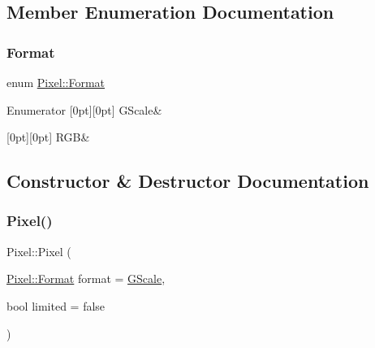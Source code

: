 \subsection{Member Enumeration Documentation}
\mbox{\label{class_pixel_aa1531d5d16ab3ab809a8e071145f0a50}} 
\subsubsection{\texorpdfstring{Format}{Format}}
{\footnotesize\ttfamily enum \mbox{\hyperlink{class_pixel_aa1531d5d16ab3ab809a8e071145f0a50}{Pixel\+::\+Format}}}

\begin{DoxyEnumFields}{Enumerator}
[0pt][0pt]{}\mbox{\label{class_pixel_aa1531d5d16ab3ab809a8e071145f0a50a0067e32761943fc277951f656686ce1a}} 
G\+Scale&\\
\hline

[0pt][0pt]{}\mbox{\label{class_pixel_aa1531d5d16ab3ab809a8e071145f0a50aff2c7eeaaaaf24a83e97388116481444}} 
R\+GB&\\
\hline

\end{DoxyEnumFields}


\subsection{Constructor \& Destructor Documentation}
\mbox{\label{class_pixel_ac82279ce9ebca9dde69f1b0c50adab42}} 
\subsubsection{\texorpdfstring{Pixel()}{Pixel()}\hspace{0.1cm}{\footnotesize\ttfamily [1/3]}}
{\footnotesize\ttfamily Pixel\+::\+Pixel (\begin{DoxyParamCaption}\item[{\mbox{\hyperlink{class_pixel_aa1531d5d16ab3ab809a8e071145f0a50}{Pixel\+::\+Format}}}]{format = {\ttfamily \mbox{\hyperlink{class_pixel_aa1531d5d16ab3ab809a8e071145f0a50a0067e32761943fc277951f656686ce1a}{G\+Scale}}},  }\item[{bool}]{limited = {\ttfamily false} }\end{DoxyParamCaption})\hspace{0.3cm}{\ttfamily [explicit]}}

